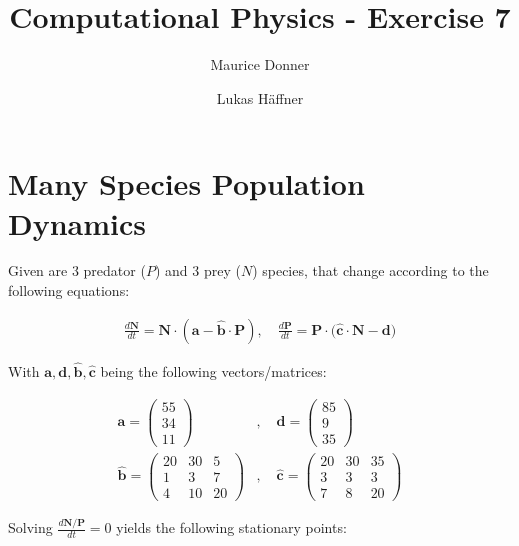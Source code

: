 \documentclass{article}
\title{Computational Physics - Exercise 7}
\author{Maurice Donner \and Lukas Häffner}
\begin{document}
\maketitle
\newpage

\section{Many Species Population Dynamics}

Given are 3 predator (\( P \)) and 3 prey (\( N \)) species, that change
according to the following equations:

\begin{align}
    \frac{d\mathbf{N}}{dt} = \mathbf{N} \cdot \left( \mathbf{a} -
    \mathbf{\hat b \cdot P} \right), \quad
    \frac{d\mathbf{P}}{dt} = \mathbf{P} \cdot \bigg( 
    \mathbf{\hat c \cdot N} - \mathbf{d} \bigg)
\end{align}

With \( \mathbf{a, d, \hat b, \hat c} \) being the following vectors/matrices:

\begin{align}
    \mathbf{a} =
    \left(
	\begin{matrix}
	    55 \\ 
	    34 \\
	    11	 
	\end{matrix}
    \right) &, \quad
    \mathbf{d} =
    \left(
	\begin{matrix}
	    85 \\ 
	    9 \\
	    35 
	\end{matrix}
    \right) \\[.5cm]
    \mathbf{\hat b} = 
    \left(
	\begin{matrix}
	    20 & 30 & 5 \\ 
	    1 & 3 & 7 \\
	    4 & 10 & 20 
	\end{matrix}
    \right) &, \quad
    \mathbf{\hat c} =
    \left(
	\begin{matrix}
	    20 & 30 & 35 \\ 
	    3 & 3 & 3 \\
	    7 & 8 & 20 
	\end{matrix}
    \right)
\end{align}

Solving \( \frac{d \mathbf{N/P}}{dt} = 0 \) yields the following stationary
points:
\end{document}
